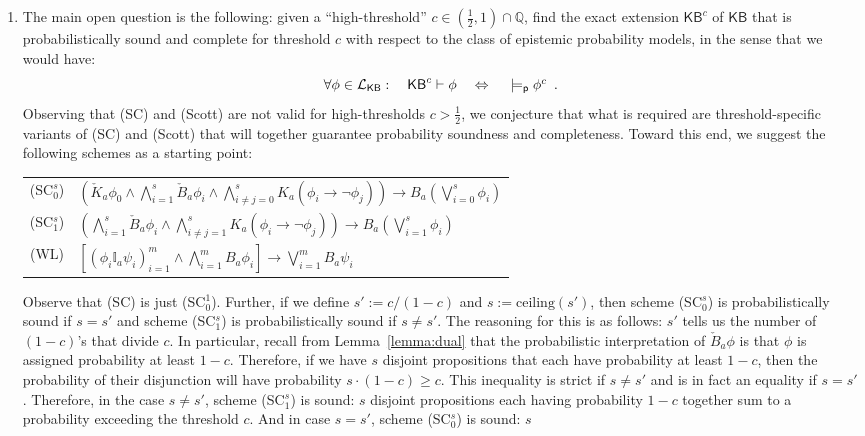 \documentclass[12pt]{article}
\theoremstyle{definition}
\newcommand{\Rat}{\mathbb{Q}}  %
\newcommand{\Lang}{{\cal L}}   %
\newcommand{\KB}{{\mathsf{KB}}}                        %
\newcommand{\modelsp}{\models_{\mathsf{p}}}                  %
\begin{document}
\begin{enumerate}
\item
The main open question is the following: given a ``high-threshold''
$c\in(\frac 12,1)\cap\Rat$, find the exact extension $\KB^c$ of $\KB$ that is
probabilistically sound and complete for threshold $c$ with respect to
the class of epistemic probability models, in the sense that we would have:
\[
\textstyle 
\forall\phi\in\Lang_\KB:\quad
\KB^c\vdash\phi
\quad\Leftrightarrow\quad
{}\modelsp\phi^c \enspace.
\]
Observing that (SC) and (Scott) are not valid for high-thresholds $c>\frac
12$, we conjecture that what is required are threshold-specific
variants of (SC) and (Scott) that will together guarantee probability
soundness and completeness.  Toward this end, we suggest the following
schemes as a starting point:
\begin{center}
  \renewcommand{\arraystretch}{1.3}
  \begin{tabular}[t]{cl}
    (SC$_0^s$) &
    $\textstyle(\check K_a\phi_0\land
    \bigwedge_{i=1}^s\check B_a\phi_i\land
    \bigwedge_{i\neq j=0}^s K_a(\phi_i\to\lnot \phi_j))\to 
    B_a(\bigvee_{i=0}^s \phi_i)$
    \\
    (SC$_1^s$) &
    $\textstyle(\bigwedge_{i=1}^s\check B_a\phi_i\land
    \bigwedge_{i\neq j=1}^s K_a(\phi_i\to\lnot \phi_j))
    \to B_a(\bigvee_{i=1}^s \phi_i)$
    \\
    (WL) &
    $\textstyle [(\phi_i\mathbb{I}_a\psi_i)_{i=1}^m
    \land \bigwedge_{i=1}^m B_a\phi_i] \to
    \bigvee_{i=1}^m B_a\psi_i$
  \end{tabular}
\end{center}
Observe that (SC) is just (SC$_0^1$).  Further, if we define
$s':=c/(1-c)$ and $s:=\text{ceiling}(s')$, then scheme (SC$_0^s$) is
probabilistically sound if $s=s'$ and scheme (SC$_1^s$) is
probabilistically sound if $s\neq s'$.  The reasoning for this is as
follows: $s'$ tells us the number of $(1-c)$'s that divide $c$.  In
particular, recall from Lemma~\ref{lemma:dual} that the probabilistic
interpretation of $\check B_a\phi$ is that $\phi$ is assigned
probability at least $1-c$.  Therefore, if we have $s$ disjoint
propositions that each have probability at least $1-c$, then the
probability of their disjunction will have probability
$s\cdot(1-c)\geq c$.  This inequality is strict if $s\neq s'$ and is
in fact an equality if $s=s'$.  Therefore, in the case $s\neq s'$,
scheme (SC$_1^s$) is sound: $s$ disjoint propositions each having
probability $1-c$ together sum to a probability exceeding the
threshold $c$.  And in case $s=s'$, scheme (SC$_0^s$) is sound: $s$

\end{enumerate}
\end{document}
